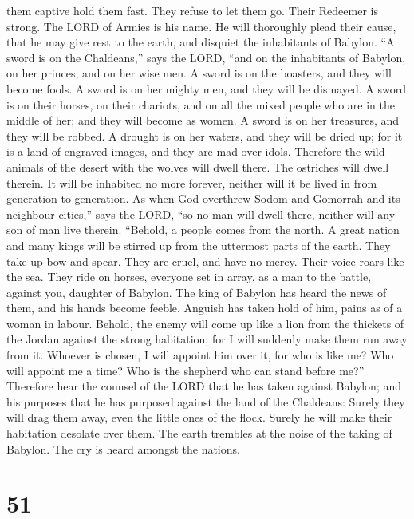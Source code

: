 them captive hold them fast. They refuse to let them go. 
Their Redeemer is strong. The LORD of Armies is his name. He will
thoroughly plead their cause, that he may give rest to the earth, and
disquiet the inhabitants of Babylon.  ``A sword is on the
Chaldeans,'' says the LORD, ``and on the inhabitants of Babylon, on her
princes, and on her wise men.  A sword is on the boasters,
and they will become fools. A sword is on her mighty men, and they will
be dismayed.  A sword is on their horses, on their
chariots, and on all the mixed people who are in the middle of her; and
they will become as women. A sword is on her treasures, and they will be
robbed.  A drought is on her waters, and they will be dried
up; for it is a land of engraved images, and they are mad over idols.
 Therefore the wild animals of the desert with the wolves
will dwell there. The ostriches will dwell therein. It will be inhabited
no more forever, neither will it be lived in from generation to
generation.  As when God overthrew Sodom and Gomorrah and
its neighbour cities,'' says the LORD, ``so no man will dwell there,
neither will any son of man live therein.  ``Behold, a
people comes from the north. A great nation and many kings will be
stirred up from the uttermost parts of the earth.  They
take up bow and spear. They are cruel, and have no mercy. Their voice
roars like the sea. They ride on horses, everyone set in array, as a man
to the battle, against you, daughter of Babylon.  The king
of Babylon has heard the news of them, and his hands become feeble.
Anguish has taken hold of him, pains as of a woman in labour.
 Behold, the enemy will come up like a lion from the
thickets of the Jordan against the strong habitation; for I will
suddenly make them run away from it. Whoever is chosen, I will appoint
him over it, for who is like me? Who will appoint me a time? Who is the
shepherd who can stand before me?''  Therefore hear the
counsel of the LORD that he has taken against Babylon; and his purposes
that he has purposed against the land of the Chaldeans: Surely they will
drag them away, even the little ones of the flock. Surely he will make
their habitation desolate over them.  The earth trembles at
the noise of the taking of Babylon. The cry is heard amongst the
nations.

\hypertarget{section-50}{%
\section{51}\label{section-50}}

